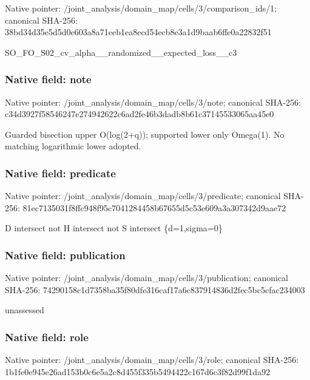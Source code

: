 \documentclass[10pt,a4paper]{article}
\begin{document}
Native pointer: /joint\_analysis/domain\_m\allowbreak{}ap/cells/3/comparison\_id\allowbreak{}s/1; canonical SHA-256: 38bd34d35e5d5d0e603a8a71\allowbreak{}eeb1ea8ecd54ecb8e3a1d9ba\allowbreak{}ab6ffe0a22832f51


SO\_FO\_S02\_cv\_alpha\_\_rand\allowbreak{}omized\_\_expected\_loss\_\_c\allowbreak{}3


\subsubsection{Native field: note}


Native pointer: /joint\_analysis/domain\_map/cells/3/note; canonical SHA-256: c34d3927f58546247e274942\allowbreak{}622c6ad2fe46b3dadb8b61c3\allowbreak{}7145533065aa45e0


Guarded bisection upper O(log(2+q)); supported lower only Omega(1). No matching logarithmic lower adopted.


\subsubsection{Native field: predicate}


Native pointer: /joint\_analysis/domain\_m\allowbreak{}ap/cells/3/predicate; canonical SHA-256: 81ec7135031f8ffc948f95c7\allowbreak{}041284458b67655d5c53e609\allowbreak{}a3a307342d9aae72


D intersect not H intersect not S intersect \{d=1,sigma=0\}


\subsubsection{Native field: publication}


Native pointer: /joint\_analysis/domain\_m\allowbreak{}ap/cells/3/publication; canonical SHA-256: 74290158c1d7358ba35f80df\allowbreak{}e316caf17a6c837914836d2f\allowbreak{}ec5bc5cfac234003


unassessed


\subsubsection{Native field: role}


Native pointer: /joint\_analysis/domain\_map/cells/3/role; canonical SHA-256: 1b1fe0e945e26ad153b0c6e5\allowbreak{}a2c8d455f335b5494422c167\allowbreak{}d6c3f82d99f1da92
\end{document}
